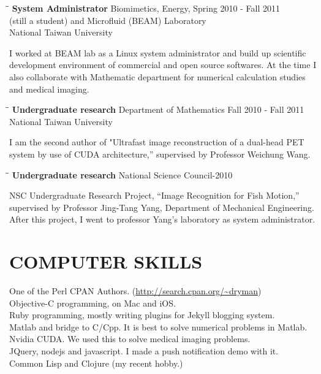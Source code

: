 \documentclass{res}
\begin{document}
\begin{resume}
   \begin{tabbing}
   \hspace{2.3in}\= \hspace{2.6in}\= \kill %
    {\bf System Administrator } \>Biomimetics, Energy, \> Spring 2010 - Fall 2011\\
    {(still a student)}   \>and Microfluid (BEAM) Laboratory\\
                          \> National Taiwan University
   \end{tabbing}\vspace{-20pt}
   I worked at BEAM lab as a Linux system administrator and build up scientific
   development environment of commercial and open source softwares. At the time
   I also collaborate with Mathematic department for numerical calculation
   studies and medical imaging.
   \begin{tabbing}%
   \hspace{2.3in}\= \hspace{2.6in}\= \kill %
   {\bf Undergraduate research} \>Department of Mathematics\> Fall 2010 - Fall 2011\\
                          \>National Taiwan University
   \end{tabbing}\vspace{-20pt}
   I am the second author of "Ultrafast image reconstruction of a dual-head PET
   system by use of CUDA architecture,” supervised by Professor Weichung Wang.
   \begin{tabbing}%
   \hspace{2.3in}\= \hspace{2.6in}\= \kill %
   {\bf Undergraduate research} \>National Science Council-2010 \\
   \end{tabbing}\vspace{-20pt}
   NSC Undergraduate Research Project, “Image Recognition for Fish Motion,”
   supervised by Professor Jing-Tang Yang, Department of Mechanical Engineering.
   After this project, I went to professor Yang's laboratory as system
   administrator.


\section{COMPUTER SKILLS}          
  One of the Perl CPAN Authors. (\url{http://search.cpan.org/~dryman}) \\
  Objective-C programming, on Mac and iOS. \\
  Ruby programming, mostly writing plugins for Jekyll blogging system.\\
  Matlab and bridge to C/Cpp. It is best to solve numerical problems in Matlab.\\
  Nvidia CUDA. We used this to solve medical imaging problems.\\
  JQuery, nodejs and javascript. I made a push notification demo with it.\\
  Common Lisp and Clojure (my recent hobby.)\\


\end{resume}
\end{document}
